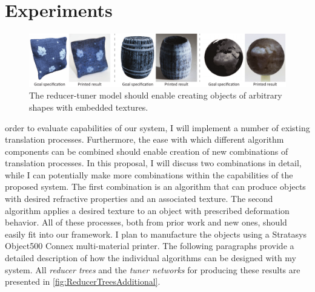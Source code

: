 \chapter{Experiments}
\label{chap:results}
\begin{figure}[t]
\includegraphics[width=\linewidth]{figure/TexturedExamples.pdf}
\caption {The reducer-tuner model should enable creating objects of arbitrary shapes with embedded textures.}
\label{fig:texturedExamples}
\end{figure}
 order to evaluate capabilities of our system, I will implement a number of existing translation processes.
Furthermore, the ease with which different algorithm components can be combined should enable creation of new combinations of translation processes. In this proposal, I will discuss two combinations in detail, while I can potentially make more combinations within the capabilities of the proposed system.
The first combination is an algorithm that can produce objects with desired refractive properties and an associated texture.
The second algorithm applies a desired texture to an object with prescribed deformation behavior.
All of these processes, both from prior work and new ones, should easily fit into our framework. I plan to manufacture the objects using a Stratasys Object500 Connex  multi-material printer.
The following paragraphs provide a detailed description of how the individual algorithms can be designed with my system.
All \emph{reducer trees} and the \emph{tuner networks} for producing these results are presented in \autoref{fig:ReducerTreesAdditional}.

